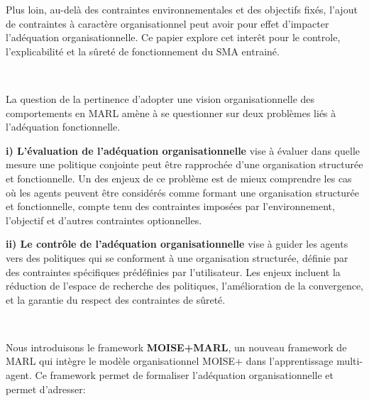 \documentclass[sigconf,anonymous]{aamas}
\begin{document}
Plus loin, au-delà des contraintes environnementales et des objectifs fixés, l'ajout de contraintes à caractère organisationnel peut avoir pour effet d'impacter l'adéquation organisationnelle. Ce papier explore cet interêt pour le controle, l'explicabilité et la sûreté de fonctionnement du SMA entrainé.

\

\noindent La question de la pertinence d'adopter une vision organisationnelle des comportements en MARL amène à se questionner sur deux problèmes liés à l'adéquation fonctionnelle.

\quad \textbf{i) L'évaluation de l'adéquation organisationnelle} vise à évaluer dans quelle mesure une politique conjointe peut être rapprochée d'une organisation structurée et fonctionnelle. Un des enjeux de ce problème est de mieux comprendre les cas où les agents peuvent être considérés comme formant une organisation structurée et fonctionnelle, compte tenu des contraintes imposées par l'environnement, l'objectif et d'autres contraintes optionnelles.

\quad \textbf{ii) Le contrôle de l'adéquation organisationnelle} vise à guider les agents vers des politiques qui se conforment à une organisation structurée, définie par des contraintes spécifiques prédéfinies par l'utilisateur.
Les enjeux incluent la réduction de l'espace de recherche des politiques, l'amélioration de la convergence, et la garantie du respect des contraintes de sûreté.

\

\noindent Nous introduisons le framework \textbf{MOISE+MARL}, un nouveau framework de MARL qui intègre le modèle organisationnel MOISE+ dans l'apprentissage multi-agent. Ce framework permet de formaliser l'adéquation organisationnelle et permet d'adresser:
\end{document}
